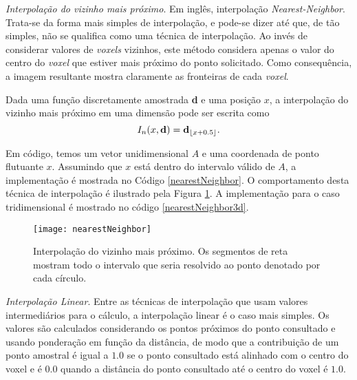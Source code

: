 \emph{Interpolação do vizinho mais próximo}. Em inglês, interpolação \emph{Nearest-Neighbor}. Trata-se da forma mais simples de interpolação, e pode-se dizer até que, de tão simples, não se qualifica como uma técnica de interpolação. Ao invés de considerar valores de {\it voxels} vizinhos, este método considera apenas o valor do centro do {\it voxel} que estiver mais próximo do ponto solicitado. Como consequência, a imagem resultante mostra claramente as fronteiras de cada {\it voxel}. 

Dada uma função discretamente amostrada {\bf d} e uma posição $x$, a interpolação do vizinho mais próximo em uma dimensão pode ser escrita como
\[
I_{n}(x, {\bf d}) = {\bf d}_{\floor*{x+0.5}}.
\]

Em código, temos um vetor unidimensional $A$ e uma coordenada de ponto flutuante $x$. Assumindo que $x$ está dentro do intervalo válido de $A$, a implementação é mostrada no Código \ref{nearestNeighbor}. O comportamento desta técnica de interpolação é ilustrado pela Figura \ref{nearestNeighborImage}. A implementação para o caso tridimensional é mostrado no código \ref{nearestNeighbor3d}. \\

\begin{figure}[!htb]

\end{figure}

\begin{figure}[!htb]
\center
\texttt{[image: nearestNeighbor]}
\caption{Interpolação do vizinho mais próximo. Os segmentos de reta mostram todo o intervalo que seria resolvido ao ponto denotado por cada círculo.}
\label{nearestNeighborImage}
\end{figure}


\begin{figure}[!htb]

\end{figure}

\emph{Interpolação Linear}. Entre as técnicas de interpolação que usam valores intermediários para o cálculo, a interpolação linear é o caso mais simples. Os valores são calculados considerando os pontos próximos do ponto consultado e usando ponderação em função da distância, de modo que a contribuição de um ponto amostral é igual a $1.0$ se o ponto consultado está alinhado com o centro do voxel e é $0.0$ quando a distância do ponto consultado até o centro do voxel é $1.0$.

